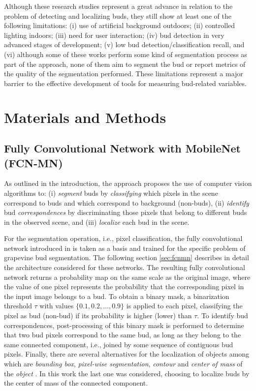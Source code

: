 \documentclass[a4paper,authoryear,review]{elsarticle}
\begin{document}
	Although these research studies represent a great advance in relation to the problem of detecting and localizing buds, they still show at least one of the following limitations: (i) use of artificial background outdoors; (ii) controlled lighting indoors; (iii) need for user interaction; (iv) bud detection in very advanced stages of development; (v) low bud detection/classification recall, and (vi) although some of these works perform some kind of segmentation process as part of the approach, none of them aim to segment the bud or report metrics of the quality of the segmentation performed. These limitations represent a major barrier to the effective development of tools for measuring bud-related variables. 
	
	\section{Materials and Methods}
	\label{sec:matmet}
	
	
	\subsection{Fully Convolutional Network with MobileNet (FCN-MN)}
	\label{sec:fcn}
	
	As outlined in the introduction, the approach proposes the use of computer vision algorithms to: (i) \emph{segment} buds by \emph{classifying} which pixels in the scene correspond to buds and which correspond to background (non-buds), (ii) \emph{identify} bud \emph{correspondences} by discriminating those pixels that belong to different buds in the observed scene, and (iii) \emph{localize} each bud in the scene. 
	
	For the segmentation operation, i.e., pixel classification, the fully convolutional network introduced in \citep{long2015fully} is taken as a basis and trained for the specific problem of grapevine bud segmentation. The following section \ref{sec:fcnmn} describes in detail the architecture considered for these networks. The resulting fully convolutional network returns a probability map on the same scale as the original image, where the value of one pixel represents the probability that the corresponding pixel in the input image belongs to a bud. 
	To obtain a binary mask, a binarization threshold $\tau$ with values $\{0.1, 0.2, \ldots, 0.9\}$ is applied to each pixel, classifying the pixel as bud (non-bud) if its probability is higher (lower) than $\tau$. To identify bud correspondences, post-processing of this binary mask is performed to determine that two bud pixels correspond to the same bud, as long as they belong to the same connected component, i.e., joined by some sequence of contiguous bud pixels. 
	Finally, there are several alternatives for the localization of objects among which are \emph{bounding box}, \emph{pixel-wise segmentation}, \emph{contour} and \emph{center of mass} of the \emph{object} \citep{lampert2008beyond}. In this work the last one was considered, choosing to localize buds by the center of mass of the connected component. 
	
\end{document}
